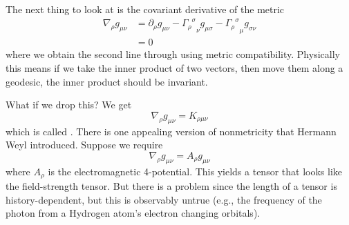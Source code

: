 The next thing to look at is the covariant derivative of the
metric
\begin{equation}
\begin{split}
\nabla_{\rho}g_{\mu\nu}
&=\partial_{\rho}g_{\mu\nu}-{{\Gamma_{\rho}}^{\sigma}}_{\nu}g_{\mu\sigma}
-{{\Gamma_{\rho}}^{\sigma}}_{\mu}g_{\sigma\nu}\\
&=0
\end{split}
\end{equation}
where we obtain the second line through using metric
compatibility. Physically this means if we take the inner product
of two vectors, then move them along a geodesic, the inner
product should be invariant.

What if we drop this? We get
\begin{equation}
\nabla_{\rho}g_{\mu\nu}=K_{\rho\mu\nu}
\end{equation}
which is called . There is one appealing
version of nonmetricity that Hermann Weyl introduced. Suppose we
require
\begin{equation}
\nabla_{\rho}g_{\mu\nu}=A_{\rho}g_{\mu\nu}
\end{equation}
where $A_{\rho}$ is the electromagnetic 4-potential. This yields
a tensor that looks like the field-strength tensor. But there is
a problem since the length of a tensor is history-dependent, but
this is observably untrue (e.g., the frequency of the photon from
a Hydrogen atom's electron changing orbitals).

